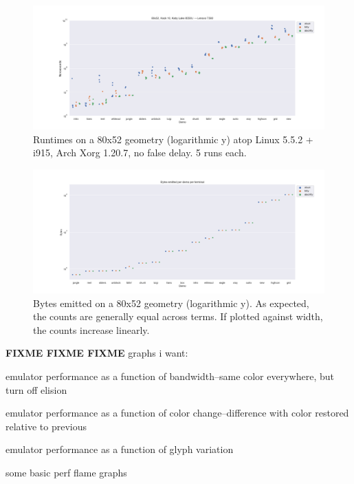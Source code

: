 \begin{figure}[!htb]
\centering
\includegraphics[width=1\textwidth]{media/i915-80x52.png}
\caption[80x52 Intel i7-8550U benchmarks.]{Runtimes on a 80x52 geometry (logarithmic y) atop Linux 5.5.2 + i915, Arch Xorg 1.20.7, no false delay. 5 runs each.}
\label{fig:intel-full}
\end{figure}

\begin{figure}[!htb]
\centering
\includegraphics[width=1\textwidth]{media/plotbytes.png}
\caption[Bytes output per demo per term.]{Bytes emitted on a 80x52 geometry (logarithmic y). As expected, the counts are generally equal across terms. If plotted against width, the counts increase linearly.}
\label{fig:nvidia-full}
\end{figure}

\textbf{FIXME FIXME FIXME}
graphs i want:
\begin{denseitemize}
\item{emulator performance as a function of bandwidth--same color everywhere, but turn off elision}
\item{emulator performance as a function of color change--difference with color restored relative to previous}
\item{emulator performance as a function of glyph variation}
\item{some basic perf flame graphs}
\end{denseitemize}
